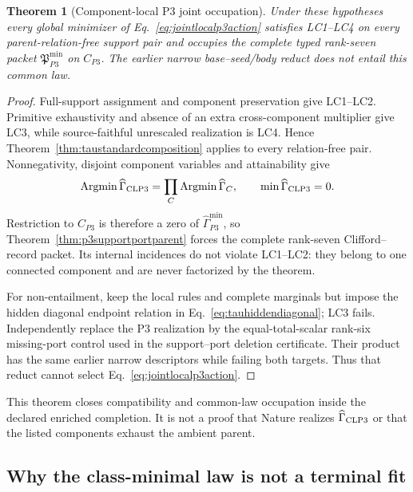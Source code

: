 \documentclass[11pt]{article}
\newtheorem{theorem}{Theorem}
\begin{document}
\begin{theorem}[Component-local P3 joint occupation]
\label{thm:jointlocalp3}
Under these hypotheses every global minimizer of
Eq.~\eqref{eq:jointlocalp3action} satisfies LC1--LC4 on every
parent-relation-free support pair and occupies the complete typed rank-seven
packet $\mathfrak P_{P3}^{\min}$ on $C_{P3}$.  The earlier narrow
base--seed/body reduct does not entail this common law.
\end{theorem}

\begin{proof}
Full-support assignment and component preservation give LC1--LC2.  Primitive
exhaustivity and absence of an extra cross-component multiplier give LC3,
while source-faithful unrescaled realization is LC4.  Hence
Theorem~\ref{thm:taustandardcomposition} applies to every relation-free pair.
Nonnegativity, disjoint component variables and attainability give
\begin{equation}
 \operatorname*{Argmin}\widehat\Gamma_{\rm CLP3}
 =\prod_C\operatorname*{Argmin}\widehat\Gamma_C,
 \qquad \min\widehat\Gamma_{\rm CLP3}=0.
 \label{eq:jointlocalp3argmin}
\end{equation}
Restriction to $C_{P3}$ is therefore a zero of
$\widehat\Gamma_{P3}^{\min}$, so
Theorem~\ref{thm:p3supportportparent} forces the complete rank-seven
Clifford--record packet.  Its internal incidences do not violate LC1--LC2:
they belong to one connected component and are never factorized by the
theorem.

For non-entailment, keep the local rules and complete marginals but impose the
hidden diagonal endpoint relation in Eq.~\eqref{eq:tauhiddendiagonal}; LC3
fails.  Independently replace the P3 realization by the equal-total-scalar
rank-six missing-port control used in the support--port deletion certificate.
Their product has the same earlier narrow descriptors while failing both
targets.  Thus that reduct cannot select
Eq.~\eqref{eq:jointlocalp3action}.
\end{proof}

This theorem closes compatibility and common-law occupation inside the
declared enriched completion.  It is not a proof that Nature realizes
$\widehat\Gamma_{\rm CLP3}$ or that the listed components exhaust the ambient
parent.

\subsection{Why the class-minimal law is not a terminal fit}
\end{document}
